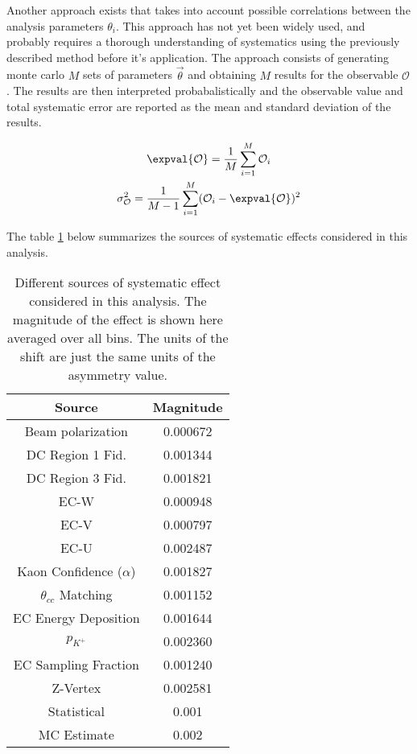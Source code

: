 Another approach exists that takes into account possible correlations between the analysis parameters $\theta_i$.  This approach has not yet been widely used, and probably requires a thorough understanding of systematics using the previously described method before it's application.  The approach consists of generating monte carlo $M$ sets of parameters $\vec{\theta}$ and obtaining $M$ results for the observable $\mathcal{O}$.  The results are then interpreted probabalistically and the observable value and total systematic error are reported as the mean and standard deviation of the results.

\begin{gather}
  \expval{\mathcal{O}} = \frac{1}{M} \sum_{i=1}^{M} \mathcal{O}_i \\
  \sigma_{\mathcal{O}}^{2} = \frac{1}{M-1} \sum_{i=1}^{M} (\mathcal{O}_i - \expval{\mathcal{O}})^2
\end{gather}

The table \ref{table:kaon-systematics} below summarizes the sources of systematic effects considered in this analysis.

\begin{table}
  \centering
  \begin{tabular}{c|c}
    Source & Magnitude \\ 
    \hline
    Beam polarization & 0.000672 \\ 
    DC Region 1 Fid. & 0.001344 \\ 
    DC Region 3 Fid. & 0.001821 \\
    EC-W & 0.000948 \\ 
    EC-V & 0.000797 \\
    EC-U & 0.002487 \\
    Kaon Confidence ($\alpha$) & 0.001827 \\
    $\theta_{cc}$ Matching & 0.001152 \\
    EC Energy Deposition & 0.001644 \\
    $p_{K^+}$ & 0.002360 \\ 
    EC Sampling Fraction & 0.001240 \\
    Z-Vertex & 0.002581 \\
    \hline 
    Statistical & 0.001 \\ 
    \hline
    MC Estimate & 0.002
  \end{tabular}
  \caption{Different sources of systematic effect considered in this analysis.  The magnitude of the effect is shown here averaged over all bins.  The units of the shift are just the same units of the asymmetry value. }
  \label{table:kaon-systematics}
\end{table}

